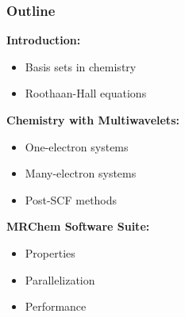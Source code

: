 \begin{frame}
  \frametitle{Outline}
  \textbf{Introduction:}
  \begin{itemize}
    \item Basis sets in chemistry
    \item Roothaan-Hall equations
  \end{itemize}

  \vspace{5mm}

  \textbf{Chemistry with Multiwavelets:}
  \begin{itemize}
    \item One-electron systems
    \item Many-electron systems
    \item Post-SCF methods
  \end{itemize}

  \vspace{5mm}

  \textbf{MRChem Software Suite:}
  \begin{itemize}
    \item Properties
    \item Parallelization
    \item Performance
  \end{itemize}
\end{frame}

